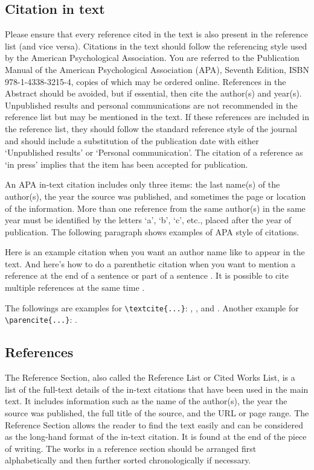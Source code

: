 \documentclass[12pt,a4paper]{article}
\begin{document}
\subsection{Citation in text}
Please ensure that every reference cited in the text is also present in the reference list (and vice versa). Citations in the text should follow the referencing style used by the American Psychological Association. You are referred to the Publication Manual of the American Psychological Association (APA), Seventh Edition, ISBN 978-1-4338-3215-4, copies of which may be ordered online. References in the Abstract should be avoided, but if essential, then cite the author(s) and year(s). Unpublished results and personal communications are not recommended in the reference list but may be mentioned in the text. If these references are included in the reference list, they should follow the standard reference style of the journal and should include a substitution of the publication date with either ‘Unpublished results’ or ‘Personal communication’. The citation of a reference as ‘in press’ implies that the item has been accepted for publication. 

An APA in-text citation includes only three items: the last name(s) of the author(s), the year the source was published, and sometimes the page or location of the information. More than one reference from the same author(s) in the same year must be identified by the letters ‘a’, ‘b’, ‘c’, etc., placed after the year of publication. The following paragraph shows examples of APA style of citations.

Here is an example citation when you want an author name like \textcite{collins2011a} to appear in the text. And here's how to do a parenthetic citation when you want to mention a reference at the end of a sentence or part of a sentence \parencite{collins2013}. It is possible to cite multiple references at the same time \parencite{collins2011b,collins2016,lunn2007a,lunn2007b,ross2006,shannon1948}.

The followings are examples for \verb+\textcite{...}+: \textcite{rahman2019centroidb}, \textcite{krizhevsky2012imagenet, horvath2018dna}, and \textcite{lecun2015deep, zhang2018fine, ravi2016deep}. Another example for \verb+\parencite{...}+: \parencite{bahdanau2014neural,imboden2018cardiorespiratory,motiian2017unified,murphy2012machine,ji20123d}.

\subsection{References}
The Reference Section, also called the Reference List or Cited Works List, is a list of the full-text details of the in-text citations that have been used in the main text. It includes information such as the name of the author(s), the year the source was published, the full title of the source, and the URL or page range. The Reference Section allows the reader to find the text easily and can be considered as the long-hand format of the in-text citation. It is found at the end of the piece of writing. The works in a reference section should be arranged first alphabetically and then further sorted chronologically if necessary.
\end{document}
